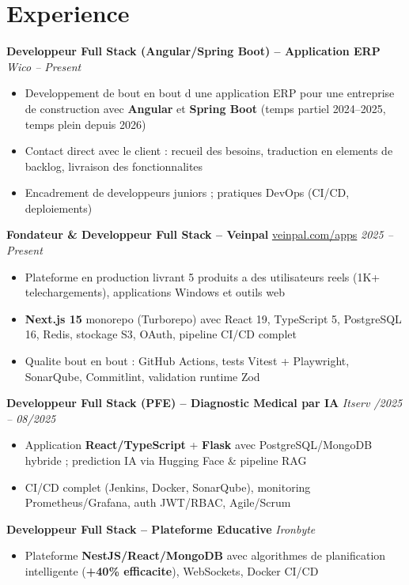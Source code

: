 \documentclass[10pt,a4paper]{article}
\begin{document}
\section*{Experience}
{\small

\textbf{Developpeur Full Stack (Angular/Spring Boot) -- Application ERP} \hfill \textit{Wico \;\textbar{} -- Present}
\begin{itemize}
  \item Developpement de bout en bout d une application ERP pour une entreprise de construction avec \textbf{Angular} et \textbf{Spring Boot} (temps partiel 2024--2025, temps plein depuis 2026)
  \item Contact direct avec le client : recueil des besoins, traduction en elements de backlog, livraison des fonctionnalites
  \item Encadrement de developpeurs juniors ; pratiques DevOps (CI/CD, deploiements)
\end{itemize}

\vspace{2pt}
\textbf{Fondateur \& Developpeur Full Stack -- Veinpal} \hfill \href{https://veinpal.com/apps}{veinpal.com/apps} \;\textbar\; \textit{2025 -- Present}
\begin{itemize}
  \item Plateforme en production livrant 5 produits a des utilisateurs reels (1K+ telechargements), applications Windows et outils web
  \item \textbf{Next.js 15} monorepo (Turborepo) avec React 19, TypeScript 5, PostgreSQL 16, Redis, stockage S3, OAuth, pipeline CI/CD complet
  \item Qualite bout en bout : GitHub Actions, tests Vitest + Playwright, SonarQube, Commitlint, validation runtime Zod
\end{itemize}

\vspace{2pt}
\textbf{Developpeur Full Stack (PFE) -- Diagnostic Medical par IA} \hfill \textit{Itserv \;\textbar{}/2025 -- 08/2025}
\begin{itemize}
  \item Application \textbf{React/TypeScript} + \textbf{Flask} avec PostgreSQL/MongoDB hybride ; prediction IA via Hugging Face \& pipeline RAG
  \item CI/CD complet (Jenkins, Docker, SonarQube), monitoring Prometheus/Grafana, auth JWT/RBAC, Agile/Scrum
\end{itemize}

\vspace{2pt}
\textbf{Developpeur Full Stack -- Plateforme Educative} \hfill \textit{Ironbyte \;\textbar{}}
\begin{itemize}
  \item Plateforme \textbf{NestJS/React/MongoDB} avec algorithmes de planification intelligente (\textbf{+40\% efficacite}), WebSockets, Docker CI/CD
\end{itemize}

}
\end{document}
